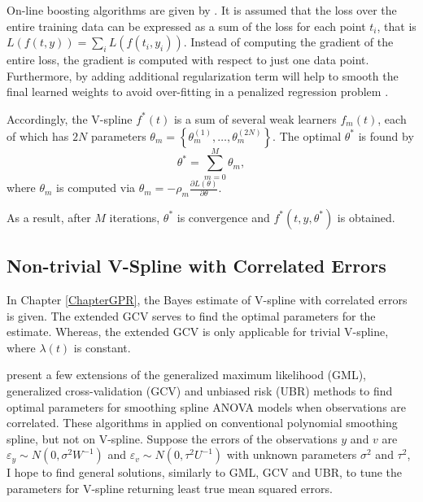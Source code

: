 On-line boosting algorithms are given by \cite{babenko2009family, beygelzimer2015online}. It is assumed that the loss over the entire training data can be expressed as a sum of the loss for each point $t_i$, that is $L(f(t,y))=\sum_i L(f(t_i,y_i))$. Instead of computing the gradient of the entire loss, the gradient is computed with respect to just one data point. Furthermore, by adding additional regularization term will help to smooth the final learned weights to avoid over-fitting in a penalized regression problem \citep{chen2016xgboost}. 

Accordingly, the V-spline $f^*(t)$ is a sum of several weak learners $f_m(t)$, each of which has $2N$ parameters $\theta_m=\left\lbrace \theta_m^{(1)},\ldots,\theta_m^{(2N)}\right\rbrace$. The optimal $\theta^*$ is found by 
\begin{equation*}
\theta^*=\sum_{m=0}^{M}\theta_m,
\end{equation*}
where $\theta_m$ is computed via $\theta_m=-\rho_m\frac{\partial L(\theta)}{\partial \theta}$. 

As a result, after $M$ iterations, $\theta^*$ is convergence and $f^*(t,y,\theta^*)$ is obtained. 



\subsection*{Non-trivial V-Spline with Correlated Errors}

In Chapter \ref{ChapterGPR}, the Bayes estimate of V-spline with correlated errors is given. The extended GCV serves to find the optimal parameters for the estimate. Whereas, the extended GCV is only applicable for trivial V-spline, where $\lambda(t)$ is constant. 


\cite{opsomer2001nonparametric, wang1998smoothing} present a few extensions of the generalized maximum likelihood (GML), generalized cross-validation (GCV) and unbiased risk (UBR) methods to find optimal parameters for smoothing spline ANOVA models when observations are correlated. These algorithms in applied on conventional polynomial smoothing spline, but not on V-spline. Suppose the errors of the observations $y$ and $v$ are $\varepsilon_y\sim N\left(0,\sigma^2W^{-1}\right)$ and $\varepsilon_v\sim N\left(0,\tau^2U^{-1}\right)$ with unknown parameters $\sigma^2$ and $\tau^2$, I hope to find general solutions, similarly to GML, GCV and UBR, to tune the parameters for V-spline returning least true mean squared errors. 




